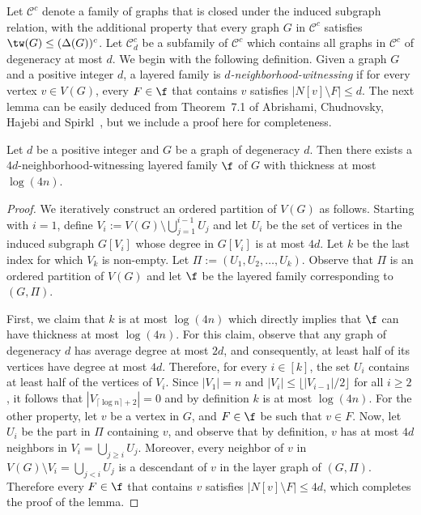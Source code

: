 Let $\mathcal{C}^c$ denote a family of graphs that is closed under the induced subgraph relation, with the additional property that every graph $G$ in $\mathcal{C}^c$ satisfies $\tw(G) \leq (\Delta(G))^c$. Let $\mathcal{C}^c_{d}$ be a subfamily of $\mathcal{C}^c$ which contains all graphs in $\mathcal{C}^c$ of degeneracy at most $d$. We begin with the following definition. Given a graph $G$ and a positive integer $d$, a layered family is \emph{$d$-neighborhood-witnessing} if  for every vertex $v\in V(G)$, every $F\in \f$ that contains $v$ satisfies $|N[v]\setminus F| \leq d$.  
The next lemma can be easily deduced from Theorem~7.1 of Abrishami, Chudnovsky, Hajebi and Spirkl~\cite{tw3}, but we include a proof here for completeness.

\begin{lemma}\label{lem:degeneracy_implies_layered_family}
    Let $d$ be a positive integer and $G$ be a graph of degeneracy $d$. Then there exists a $4d$-neighborhood-witnessing layered family $\f$ of $G$ with thickness at most $\log (4n)$.
\end{lemma}
\begin{proof}
    We iteratively construct an ordered partition of $V(G)$ as follows. Starting with $i=1$, define $V_i := V(G) \setminus \bigcup_{j=1}^{i-1} U_j$ and let $U_i$ be the set of vertices in the induced subgraph $G[V_i]$ whose degree in $G[V_i]$ is at most $4d$. Let $k$ be the last index for which $V_k$ is non-empty. Let $\Pi := (U_1, U_2, \dots, U_k)$. Observe that $\Pi$ is an ordered partition of $V(G)$ and let $\f$ be the layered family corresponding to $(G,\Pi)$.

    First, we claim that $k$ is at most $\log (4n)$ which directly implies that $\f$ can have thickness at most $\log (4n)$. For this claim, observe that any graph of degeneracy $d$ has average degree at most $2d$, and consequently, at least half of its vertices have degree at most $4d$. Therefore, for every $i\in [k]$, the set $U_i$ contains at least half of the vertices of $V_i$. Since $|V_1| = n$ and $|V_i| \leq \lfloor |V_{i-1}|/2 \rfloor$ for all $i \geq 2$, it follows that $|V_{\lceil \log n \rceil + 2}| = 0$ and by definition $k$ is at most $\log (4n)$. 
    For the other property, let $v$ be a vertex in $G$, and $F \in \f$ be such that $v\in F$. Now, let $U_i$ be the part in $\Pi$ containing $v$, and observe that by definition, $v$ has at most $4d$ neighbors in $V_i = \bigcup_{j \geq i} U_j$. Moreover, every neighbor of $v$ in $V(G) \setminus V_i = \bigcup_{j < i} U_j$ is a descendant of $v$ in the layer graph of $(G, \Pi)$. Therefore every $F\in\f$ that contains $v$ satisfies $|N[v] \setminus F| \leq 4d$, which completes the proof of the lemma.
\end{proof}


